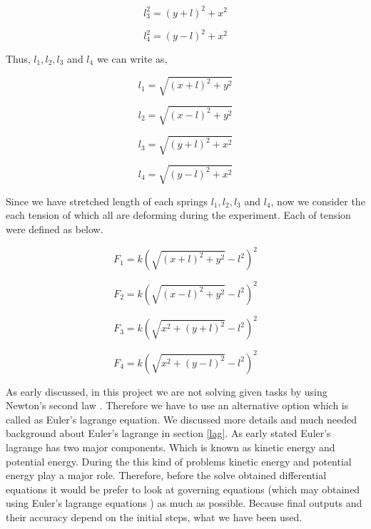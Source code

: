 \begin{equation}
    \label{s3}
    l^2_3 = (y+l)^2+x^2
\end{equation}

\begin{equation}
    \label{s4}
    l^2_4 = (y-l)^2+x^2
\end{equation}

Thus, $l_1,l_2,l_3$ and $l_4$ we can write as, 

\begin{equation}
    \label{s11}
    l_1 = \sqrt{(x+l)^2+y^2}
\end{equation}

\begin{equation}
    \label{s22}
    l_2 = \sqrt{(x-l)^2+y^2}
\end{equation}

\begin{equation}
    \label{s33}
    l_3 = \sqrt{(y+l)^2+x^2}
\end{equation}

\begin{equation}
    \label{s44}
    l_4 = \sqrt{(y-l)^2+x^2}
\end{equation}

Since we have stretched length of each springs $l_1,l_2,l_3$ and $l_4$, now we consider the each tension of which all are deforming during the experiment. Each of tension were defined as below. 


\begin{equation}
    \label{t1}
    F_1 = k(\sqrt{(x+l)^2+y^2}- l^2 )^2
\end{equation}

\begin{equation}
    \label{t2}
    F_2 = k(\sqrt{(x-l)^2+y^2}- l^2 )^2
\end{equation}

\begin{equation}
    \label{t3}
    F_3 = k(\sqrt{x^2+(y+l)^2}- l^2 )^2
\end{equation}

\begin{equation}
    \label{t4}
    F_4 = k(\sqrt{x^2+(y-l)^2}- l^2 )^2
\end{equation}

As early discussed, in this project we are not solving given tasks by using Newton's second law \cite{ghayesh2012nonlinear}. Therefore we have to use an alternative option which is called as Euler's lagrange equation. We discussed more details and much needed background about Euler's lagrange in section \ref{lag}. As early stated Euler's lagrange has two major components. Which is known as kinetic energy and potential energy. During the this kind of problems kinetic energy and potential energy play a major role. Therefore, before the solve obtained differential equations it would be prefer to look at governing equations (which may obtained using Euler's lagrange equations ) as much as possible. Because final outputs and their accuracy depend on the initial steps, what we have been used.  

